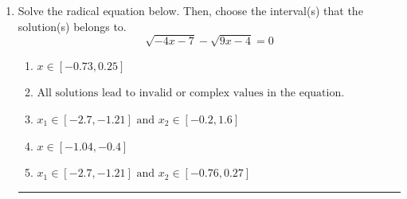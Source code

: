\documentclass[14pt]{extbook}
\newcommand{\litem}[1]{\item#1\hspace*{-1cm}\rule{\textwidth}{0.4pt}}
\begin{document}
\begin{enumerate}
{\begin{enumerate}[label=\Alph*.]
\end{enumerate} }
\litem{
Solve the radical equation below. Then, choose the interval(s) that the solution(s) belongs to.\[ \sqrt{-4 x - 7} - \sqrt{9 x - 4} = 0 \]\begin{enumerate}[label=\Alph*.]
\item \( x \in [-0.73,0.25] \)
\item \( \text{All solutions lead to invalid or complex values in the equation.} \)
\item \( x_1 \in [-2.7, -1.21] \text{ and } x_2 \in [-0.2,1.6] \)
\item \( x \in [-1.04,-0.4] \)
\item \( x_1 \in [-2.7, -1.21] \text{ and } x_2 \in [-0.76,0.27] \)

\end{enumerate} }
\end{enumerate}
\end{document}
